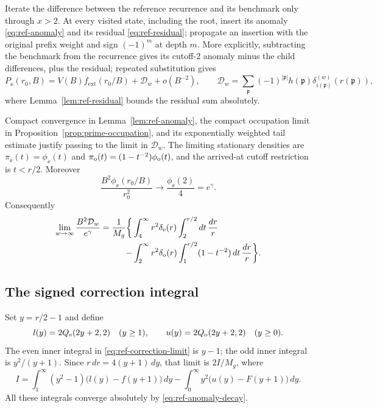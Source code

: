 Iterate the difference between the reference recurrence and its
benchmark only through $x>2$.  At every visited state, including the
root, insert its anomaly \eqref{eq:ref-anomaly} and its residual
\eqref{eq:ref-residual}; propagate an insertion with the original
prefix weight and sign $(-1)^m$ at depth $m$.  More explicitly,
subtracting the benchmark from the recurrence gives its cutoff-$2$
anomaly minus the child differences, plus the residual; repeated
substitution gives
\begin{equation}\label{eq:ref-root-decomposition}
 P_\ee(r_0,B)=V(B)f_{\mathrm{ext}}(r_0/B)
                  +\mathcal D_w+o(B^{-2}),
 \qquad
 \mathcal D_w=\sum_{\mathfrak p}(-1)^{|\mathfrak p|}
                       h(\mathfrak p)\delta_{i(\mathfrak p)}^{(w)}
                                             (r(\mathfrak p)),
\end{equation}
where Lemma~\ref{lem:ref-residual} bounds the residual sum absolutely.

Compact convergence in Lemma~\ref{lem:ref-anomaly}, the compact
occupation limit in Proposition~\ref{prop:prime-occupation}, and its
exponentially weighted tail estimate justify passing to the limit in
$\mathcal D_w$.  The limiting stationary densities are
$\pi_\ee(t)=\phi_\ee(t)$ and
$\pi_\mathrm o(t)=(1-t^{-2})\phi_\mathrm o(t)$, and the arrived-at cutoff
restriction is $t<r/2$.  Moreover
\[
 \frac{B^2\phi_\ee(r_0/B)}{r_0^2}\longrightarrow
                         \frac{\phi_\ee(2)}4=e^\gamma.
\]
Consequently
\begin{align}\label{eq:ref-correction-limit}
 \lim_{w\to\infty}\frac{B^2\mathcal D_w}{e^\gamma}
  =\frac1{M_g}\biggl\{
   &\int_4^\infty r^2\delta_\mathrm e(r)
                   \int_2^{r/2}dt\,\frac{dr}{r}\notag\\
   -&\int_2^\infty r^2\delta_\mathrm o(r)
                   \int_1^{r/2}(1-t^{-2})\,dt\,\frac{dr}{r}
                   \biggr\}.
\end{align}

\subsection{The signed correction integral}

Set $y=r/2-1$ and define
\[
 l(y)=2Q_\mathrm e(2y+2,2)\quad(y\geq1),\qquad
 u(y)=2Q_\mathrm o(2y+2,2)\quad(y\geq0).
\]
The even inner integral in \eqref{eq:ref-correction-limit} is $y-1$;
the odd inner integral is $y^2/(y+1)$.  Since $r\,dr=4(y+1)\,dy$,
that limit is $2I/M_g$, where
\begin{equation}\label{eq:ref-I}
 I=\int_1^\infty(y^2-1)\bigl(l(y)-f(y+1)\bigr)\,dy
       -\int_0^\infty y^2\bigl(u(y)-F(y+1)\bigr)\,dy.
\end{equation}
All these integrals converge absolutely by
\eqref{eq:ref-anomaly-decay}.

